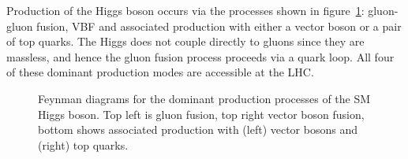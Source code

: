 Production of the Higgs boson occurs via the processes shown in
figure~\ref{fig:SMFeynmanDiagrams}: gluon-gluon fusion, \ac{VBF} and associated
production with either a vector boson or a pair of top quarks. The Higgs does
not couple directly to gluons since they are massless, and hence the gluon
fusion process proceeds via a quark loop. All four of these dominant production modes are
accessible at the LHC. 

\begin{figure}[htbp]

\caption{Feynman diagrams for the dominant production processes of the SM Higgs
boson. Top left is gluon fusion, top right vector boson fusion, bottom shows
associated production with (left) vector bosons and (right) top quarks.}
\label{fig:SMFeynmanDiagrams}
\end{figure}


